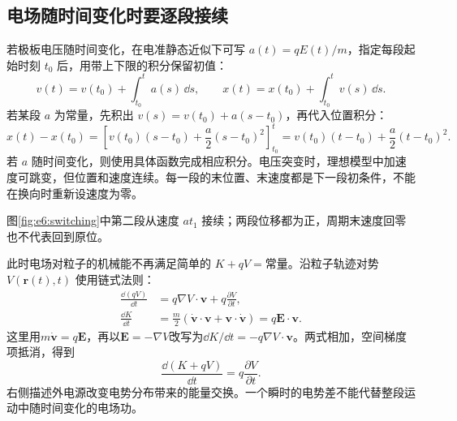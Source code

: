 \subsection{电场随时间变化时要逐段接续}

若极板电压随时间变化，在电准静态近似下可写 $a(t)=qE(t)/m$，指定每段起始时刻 $t_0$ 后，用带上下限的积分保留初值：
\[
v(t)=v(t_0)+\int_{t_0}^{t}a(s)\,\dd s,\qquad
x(t)=x(t_0)+\int_{t_0}^{t}v(s)\,\dd s.
\]
若某段 $a$ 为常量，先积出 $v(s)=v(t_0)+a(s-t_0)$，再代入位置积分：
\[
x(t)-x(t_0)
=\left[v(t_0)(s-t_0)+\frac a2(s-t_0)^2\right]_{t_0}^{t}
=v(t_0)(t-t_0)+\frac a2(t-t_0)^2.
\]
若 $a$ 随时间变化，则使用具体函数完成相应积分。电压突变时，理想模型中加速度可跳变，但位置和速度连续。每一段的末位置、末速度都是下一段初条件，不能在换向时重新设速度为零。

\par 图\ref{fig:e6:switching}中第二段从速度 $at_1$ 接续；两段位移都为正，周期末速度回零也不代表回到原位。

此时电场对粒子的机械能不再满足简单的 $K+qV=\text{常量}$。沿粒子轨迹对势 $V(\bm r(t),t)$ 使用链式法则：
\[
\begin{aligned}
\frac{\dd(qV)}{\dd t}
&=q\nabla V\cdot\bm v+q\frac{\partial V}{\partial t},\\
\frac{\dd K}{\dd t}
&=\frac m2(\dot{\bm v}\cdot\bm v+\bm v\cdot\dot{\bm v})
=q\bm E\cdot\bm v.
\end{aligned}
\]
这里用$m\dot{\bm v}=q\bm E$，再以$\bm E=-\nabla V$改写为$\dd K/\dd t=-q\nabla V\cdot\bm v$。两式相加，空间梯度项抵消，得到
\[
\frac{\dd(K+qV)}{\dd t}=q\frac{\partial V}{\partial t}.
\]
右侧描述外电源改变电势分布带来的能量交换。一个瞬时的电势差不能代替整段运动中随时间变化的电场功。



